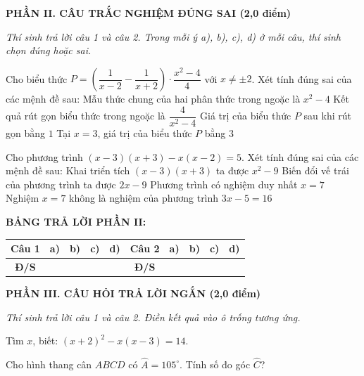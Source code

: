\documentclass[12pt,a4paper]{article}
\begin{document}
\setcounter{ex}{0}
\noindent\textbf{\large PHẦN II. CÂU TRẮC NGHIỆM ĐÚNG SAI (2,0 điểm)}

\textit{Thí sinh trả lời câu 1 và câu 2. Trong mỗi ý a), b), c), d) ở mỗi câu, thí sinh chọn đúng hoặc sai.}

\vspace{1mm}
\begin{ex}
Cho biểu thức $P = \left(\dfrac{1}{x - 2} - \dfrac{1}{x + 2}\right) \cdot \dfrac{x^2 - 4}{4}$ với $x \neq \pm 2$. Xét tính đúng sai của các mệnh đề sau:
\choiceTF
{\True Mẫu thức chung của hai phân thức trong ngoặc là $x^2 - 4$}
{\True Kết quả rút gọn biểu thức trong ngoặc là $\dfrac{4}{x^2 - 4}$}
{\True Giá trị của biểu thức $P$ sau khi rút gọn bằng $1$}
{Tại $x = 3$, giá trị của biểu thức $P$ bằng $3$}
\end{ex}

\begin{ex}
Cho phương trình $(x - 3)(x + 3) - x(x - 2) = 5$. Xét tính đúng sai của các mệnh đề sau:
\choiceTF
{\True Khai triển tích $(x - 3)(x + 3)$ ta được $x^2 - 9$}
{\True Biến đổi vế trái của phương trình ta được $2x - 9$}
{\True Phương trình có nghiệm duy nhất $x = 7$}
{Nghiệm $x = 7$ không là nghiệm của phương trình $3x - 5 = 16$}
\end{ex}


\noindent\textbf{BẢNG TRẢ LỜI PHẦN II:}
\begin{center}
\begin{tabular}{|c|c|c|c|c||c|c|c|c|c|}
\hline
\textbf{Câu 1} & \textbf{a)} & \textbf{b)} & \textbf{c)} & \textbf{d)} & \textbf{Câu 2} & \textbf{a)} & \textbf{b)} & \textbf{c)} & \textbf{d)} \\
\hline
\textbf{Đ/S} & \rule{0pt}{0.6cm} & & & & \textbf{Đ/S} & & & & \\
\hline
\end{tabular}
\end{center}
\vspace{2mm}

\setcounter{ex}{0}
\noindent\textbf{\large PHẦN III. CÂU HỎI TRẢ LỜI NGẮN (2,0 điểm)}

\textit{Thí sinh trả lời câu 1 và câu 2. Điền kết quả vào ô trống tương ứng.}

\vspace{1mm}
\begin{ex}
Tìm $x$, biết: $(x + 2)^2 - x(x - 3) = 14$. 
\end{ex}

\begin{ex}
Cho hình thang cân $ABCD$ có $\widehat{A} = 105^\circ$. Tính số đo góc $\widehat{C}$? 
\end{ex}
\end{document}
